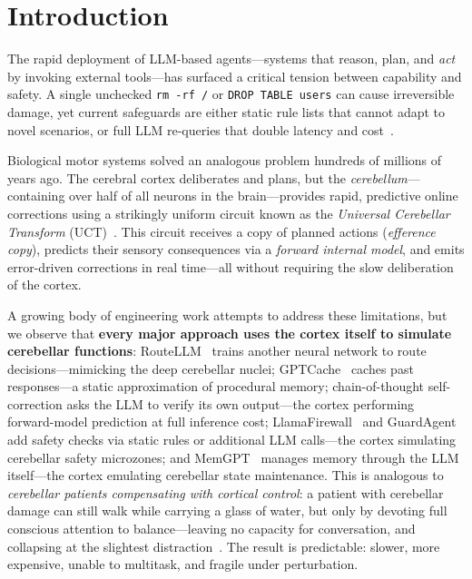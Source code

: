 \documentclass[11pt,a4paper]{article}
\begin{document}
\section{Introduction}\label{sec:intro}

The rapid deployment of LLM-based agents---systems that reason, plan, and \emph{act} by invoking external tools---has surfaced a critical tension between capability and safety.
A single unchecked \texttt{rm -rf /} or \texttt{DROP TABLE users} can cause irreversible damage, yet current safeguards are either static rule lists that cannot adapt to novel scenarios, or full LLM re-queries that double latency and cost~\citep{ruan2024toolemu,xi2023agentsurvey}.

Biological motor systems solved an analogous problem hundreds of millions of years ago.
The cerebral cortex deliberates and plans, but the \emph{cerebellum}---containing over half of all neurons in the brain---provides rapid, predictive online corrections using a strikingly uniform circuit known as the \emph{Universal Cerebellar Transform} (UCT)~\citep{schmahmann2019cerebellar,diedrichsen2019universal}.
This circuit receives a copy of planned actions (\emph{efference copy}), predicts their sensory consequences via a \emph{forward internal model}, and emits error-driven corrections in real time---all without requiring the slow deliberation of the cortex.

A growing body of engineering work attempts to address these limitations, but we observe that \textbf{every major approach uses the cortex itself to simulate cerebellar functions}:
RouteLLM~\citep{ong2024routellm} trains another neural network to route decisions---mimicking the deep cerebellar nuclei;
GPTCache~\citep{bang2023gptcache} caches past responses---a static approximation of procedural memory;
chain-of-thought self-correction asks the LLM to verify its own output---the cortex performing forward-model prediction at full inference cost;
LlamaFirewall~\citep{meta2025llamafirewall} and GuardAgent~\citep{xiang2024guardagent} add safety checks via static rules or additional LLM calls---the cortex simulating cerebellar safety microzones;
and MemGPT~\citep{packer2023memgpt} manages memory through the LLM itself---the cortex emulating cerebellar state maintenance.
This is analogous to \emph{cerebellar patients compensating with cortical control}: a patient with cerebellar damage can still walk while carrying a glass of water, but only by devoting full conscious attention to balance---leaving no capacity for conversation, and collapsing at the slightest distraction~\citep{schmahmann2019cerebellar}.
The result is predictable: slower, more expensive, unable to multitask, and fragile under perturbation.
\end{document}
